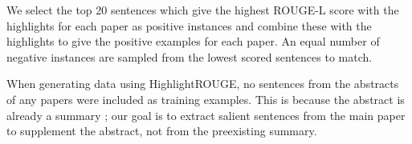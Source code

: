 \documentclass[11pt,a4paper]{article}
\begin{document}



We select the top 20 sentences which give the highest ROUGE-L score with the highlights for each paper as positive instances and combine these with the highlights to give the positive examples for each paper. An equal number of negative instances are sampled from the lowest scored sentences to match.

When generating data using HighlightROUGE, no sentences from the abstracts of any papers were included as training examples. This is because the abstract is already a summary%
; our goal is to extract salient sentences from the main paper to supplement the abstract, not from the preexisting summary. 
\end{document}
